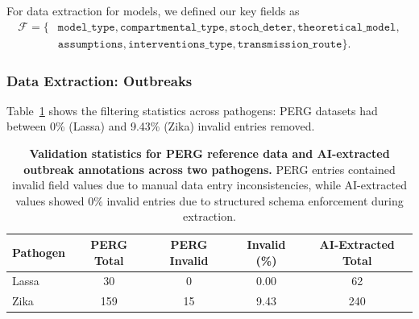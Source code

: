 For data extraction for models, we defined our key fields as
\begin{align*}
    \mathcal{F} = \{&\texttt{model\_type}, \texttt{compartmental\_type}, \texttt{stoch\_deter}, \texttt{theoretical\_model},\\ &\texttt{assumptions}, \texttt{interventions\_type}, \texttt{transmission\_route}\}.
\end{align*}




\subsubsection*{Data Extraction: Outbreaks}
Table~\ref{tab:outbreak_filtering_stats} shows the filtering statistics across pathogens: PERG datasets had between 0\% (Lassa) and 9.43\% (Zika) invalid entries removed.

\begin{table}[h]
\footnotesize
\centering
\caption{\textbf{Validation statistics for PERG reference data and AI-extracted outbreak annotations across two pathogens.} PERG entries contained invalid field values due to manual data entry inconsistencies, while AI-extracted values showed 0\% invalid entries due to structured schema enforcement during extraction.}
\label{tab:outbreak_filtering_stats}
\begin{tabular}{lcccc}
\toprule
\textbf{Pathogen} & \textbf{PERG Total} & \textbf{PERG Invalid} & \textbf{Invalid (\%)} & \textbf{AI-Extracted Total} \\
\midrule
Lassa & 30 & 0 & 0.00 & 62 \\
Zika & 159 & 15 & 9.43 & 240 \\
\bottomrule
\end{tabular}
\end{table}


